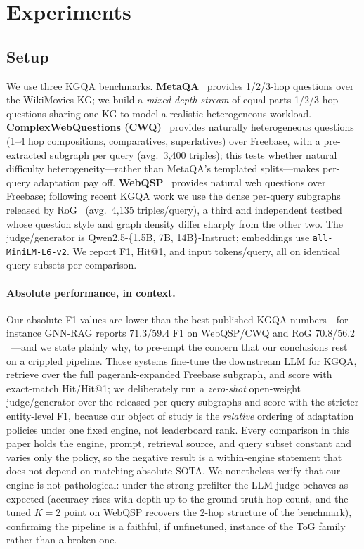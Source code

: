 \section{Experiments}
\label{sec:exp}

\subsection{Setup}
\label{sec:exp-setup}
We use three KGQA benchmarks. \textbf{MetaQA}~\cite{zhang2017variational} provides 1/2/3-hop questions over the WikiMovies KG; we build a \emph{mixed-depth stream} of equal parts 1/2/3-hop questions sharing one KG to model a realistic heterogeneous workload. \textbf{ComplexWebQuestions (CWQ)}~\cite{talmor2018knowledgebase} provides naturally heterogeneous questions (1--4 hop compositions, comparatives, superlatives) over Freebase, with a pre-extracted subgraph per query (avg.\ 3{,}400 triples); this tests whether natural difficulty heterogeneity---rather than MetaQA's templated splits---makes per-query adaptation pay off. \textbf{WebQSP}~\cite{luo2023reasoning} provides natural web questions over Freebase; following recent KGQA work we use the dense per-query subgraphs released by RoG~\cite{luo2023reasoning} (avg.\ 4{,}135 triples/query), a third and independent testbed whose question style and graph density differ sharply from the other two. The judge/generator is Qwen2.5-\{1.5B, 7B, 14B\}-Instruct; embeddings use \texttt{all-MiniLM-L6-v2}. We report F1, Hit@1, and input tokens/query, all on identical query subsets per comparison.

\paragraph{Absolute performance, in context.}
Our absolute F1 values are lower than the best published KGQA numbers---for instance GNN-RAG reports $71.3$/$59.4$ F1 on WebQSP/CWQ and RoG $70.8$/$56.2$~\cite{mavromatis2025gnnrag,luo2023reasoning}---and we state plainly why, to pre-empt the concern that our conclusions rest on a crippled pipeline. Those systems fine-tune the downstream LLM for KGQA, retrieve over the full pagerank-expanded Freebase subgraph, and score with exact-match Hit/Hit@1; we deliberately run a \emph{zero-shot} open-weight judge/generator over the released per-query subgraphs and score with the stricter entity-level F1, because our object of study is the \emph{relative} ordering of adaptation policies under one fixed engine, not leaderboard rank. Every comparison in this paper holds the engine, prompt, retrieval source, and query subset constant and varies only the policy, so the negative result is a within-engine statement that does not depend on matching absolute SOTA. We nonetheless verify that our engine is not pathological: under the strong prefilter the LLM judge behaves as expected (accuracy rises with depth up to the ground-truth hop count, and the tuned $K{=}2$ point on WebQSP recovers the $2$-hop structure of the benchmark), confirming the pipeline is a faithful, if unfinetuned, instance of the ToG family rather than a broken one.

